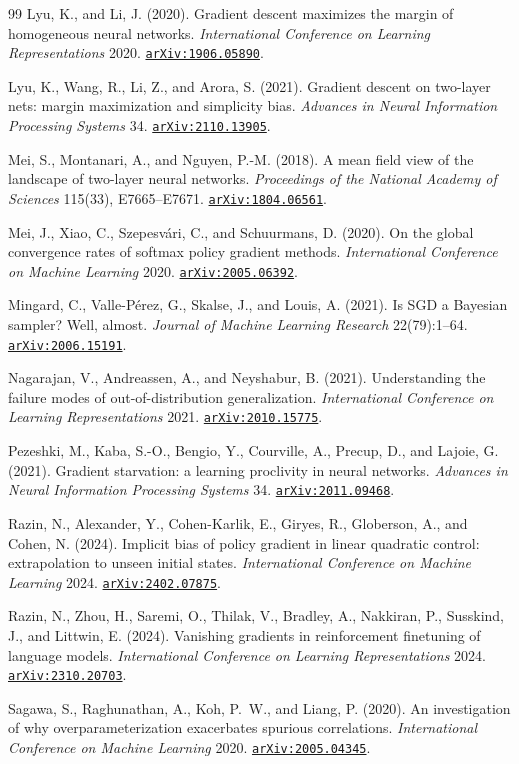 \documentclass[11pt]{amsart}
\newcommand{\arxiv}[1]{\href{https://arxiv.org/abs/#1}{\texttt{arXiv:#1}}}
\theoremstyle{plain}
\theoremstyle{definition}
\begin{document}
\begin{thebibliography}{99}
 Lyu, K., and Li, J. (2020). Gradient descent maximizes the margin of homogeneous neural networks. \emph{International Conference on Learning Representations} 2020. \arxiv{1906.05890}.

 Lyu, K., Wang, R., Li, Z., and Arora, S. (2021). Gradient descent on two-layer nets: margin maximization and simplicity bias. \emph{Advances in Neural Information Processing Systems} 34. \arxiv{2110.13905}.

 Mei, S., Montanari, A., and Nguyen, P.-M. (2018). A mean field view of the landscape of two-layer neural networks. \emph{Proceedings of the National Academy of Sciences} 115(33), E7665--E7671. \arxiv{1804.06561}.

 Mei, J., Xiao, C., Szepesv\'ari, C., and Schuurmans, D. (2020). On the global convergence rates of softmax policy gradient methods. \emph{International Conference on Machine Learning} 2020. \arxiv{2005.06392}.

 Mingard, C., Valle-P\'erez, G., Skalse, J., and Louis, A. (2021). Is SGD a Bayesian sampler? Well, almost. \emph{Journal of Machine Learning Research} 22(79):1--64. \arxiv{2006.15191}.

 Nagarajan, V., Andreassen, A., and Neyshabur, B. (2021). Understanding the failure modes of out-of-distribution generalization. \emph{International Conference on Learning Representations} 2021. \arxiv{2010.15775}.

 Pezeshki, M., Kaba, S.-O., Bengio, Y., Courville, A., Precup, D., and Lajoie, G. (2021). Gradient starvation: a learning proclivity in neural networks. \emph{Advances in Neural Information Processing Systems} 34. \arxiv{2011.09468}.

 Razin, N., Alexander, Y., Cohen-Karlik, E., Giryes, R., Globerson, A., and Cohen, N. (2024). Implicit bias of policy gradient in linear quadratic control: extrapolation to unseen initial states. \emph{International Conference on Machine Learning} 2024. \arxiv{2402.07875}.

 Razin, N., Zhou, H., Saremi, O., Thilak, V., Bradley, A., Nakkiran, P., Susskind, J., and Littwin, E. (2024). Vanishing gradients in reinforcement finetuning of language models. \emph{International Conference on Learning Representations} 2024. \arxiv{2310.20703}.

 Sagawa, S., Raghunathan, A., Koh, P.~W., and Liang, P. (2020). An investigation of why overparameterization exacerbates spurious correlations. \emph{International Conference on Machine Learning} 2020. \arxiv{2005.04345}.


\end{thebibliography}
\end{document}
